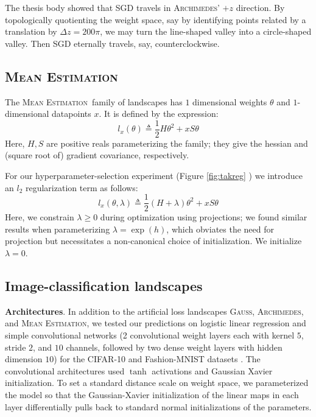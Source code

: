 \documentclass[openany, notitlepage, justified]{tufte-book}
\newcommand{\ofthree}[1]{
    {\tiny \raisebox{0.04cm}{$
        \ifthenelse{\equal{#1}{0}}{{\color{moor}\blacksquare}}{\square}
        \ifthenelse{\equal{#1}{1}}{{\color{moor}\blacksquare}}{\square}    
        \ifthenelse{\equal{#1}{2}}{{\color{moor}\blacksquare}}{\square}
    $}}%
}
\theoremstyle{plain}
\theoremstyle{definition}
\newcommand{\Gauss}{\textsc{Gauss}}
\newcommand{\Archimedes}{\textsc{Archimedes}}
\newcommand{\MeanEstimation}{\textsc{Mean Estimation}}
\begin{document}
            The thesis body showed that SGD travels in \Archimedes' $+z$
            direction.  By topologically quotienting the weight space, say by
            identifying points related by a translation by $\Delta z = 200\pi$,
            we may turn the line-shaped valley into a circle-shaped valley.
            Then SGD eternally travels, say, counterclockwise.
           
        \subsection{\MeanEstimation}
            The \MeanEstimation\, family of landscapes has $1$ dimensional
            weights $\theta$ and $1$-dimensional datapoints $x$.  It is defined
            by the expression:
            $$
                l_x(\theta)
                \triangleq
                \frac{1}{2} H \theta^2 + x S \theta
            $$
            Here, $H, S$ are positive reals parameterizing the family; they
            give the hessian and (square root of) gradient covariance,
            respectively.

            For our hyperparameter-selection experiment (Figure
            \ref{fig:takreg}\ofthree{2}) we introduce an $l_2$
            regularization term as follows:
            $$
                l_x(\theta, \lambda)
                \triangleq
                \frac{1}{2} (H + \lambda) \theta^2 + x S \theta
            $$
            Here, we constrain $\lambda\geq 0$ during optimization using
            projections; we found similar results when parameterizing $\lambda
            = \exp(h)$, which obviates the need for projection but necessitates
            a non-canonical choice of initialization.  We initialize
            $\lambda=0$.

        \subsection{Image-classification landscapes}   \label{appendix:natural}

            \textbf{Architectures}.
                In addition to the artificial loss landscapes
                \Gauss, \Archimedes, and \MeanEstimation, 
                we tested our predictions on logistic linear regression
                and simple convolutional networks (2 convolutional weight layers
                each with kernel $5$, stride $2$, and $10$ channels, followed by
                two dense weight layers with hidden dimension $10$) for the
                CIFAR-10 \citep{kr09} and Fashion-MNIST datasets \citep{xi17}.  The
                convolutional architectures used $\tanh$ activations and Gaussian
                Xavier initialization.  To set a standard distance scale on weight
                space, we parameterized the model so that the
                Gaussian-Xavier initialization of the linear maps in each layer
                differentially pulls back to standard normal initializations of the
                parameters.
                
\end{document}
